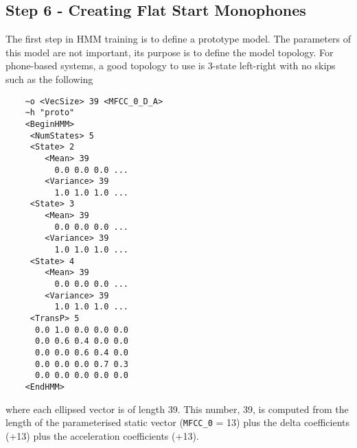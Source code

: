\subsection{Step 6 - Creating Flat Start Monophones}

The first step in HMM training is to define a prototype model.  The
parameters of this model are not important, its purpose is to
define the model topology.  For phone-based systems,  a good
topology to use is 3-state left-right with no skips such as the following
\begin{verbatim}
    ~o <VecSize> 39 <MFCC_0_D_A>
    ~h "proto"
    <BeginHMM>
     <NumStates> 5
     <State> 2
        <Mean> 39
          0.0 0.0 0.0 ...
        <Variance> 39
          1.0 1.0 1.0 ...
     <State> 3
        <Mean> 39
          0.0 0.0 0.0 ...
        <Variance> 39
          1.0 1.0 1.0 ...
     <State> 4
        <Mean> 39
          0.0 0.0 0.0 ...
        <Variance> 39
          1.0 1.0 1.0 ...
     <TransP> 5
      0.0 1.0 0.0 0.0 0.0
      0.0 0.6 0.4 0.0 0.0
      0.0 0.0 0.6 0.4 0.0
      0.0 0.0 0.0 0.7 0.3
      0.0 0.0 0.0 0.0 0.0
    <EndHMM>
\end{verbatim}
where each ellipsed vector is of length 39.  This number, 39, is computed from
the length of the parameterised static vector (\texttt{MFCC\_0} = 13) plus
the delta coefficients (+13) plus the acceleration coefficients (+13).

